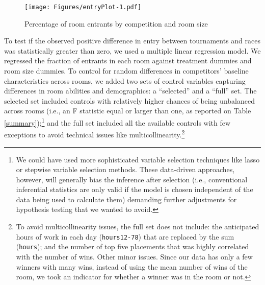 \documentclass[11pt, titlepage]{article}
\begin{document}
\begin{figure}
\caption{Percentage of room entrants by competition and room size}
\label{room entrants}
\texttt{[image: Figures/entryPlot-1.pdf]}
\end{figure}

To test if the observed positive difference in entry between tournaments
and races was statistically greater than zero, we used a multiple linear
regression model. We regressed the fraction of entrants in each room
against treatment dummies and room size dummies. To control for random
differences in competitors' baseline characteristics across rooms, we
added two sets of control variables capturing differences in room
abilities and demographics: a ``selected'' and a ``full'' set. The
selected set included controls with relatively higher chances of being
unbalanced across rooms (i.e., an F statistic equal or larger than one,
as reported on Table \ref{summary});\footnote{We could have used more
  sophisticated variable selection techniques like lasso or stepwise
  variable selection methods. These data-driven approaches, however,
  will generally bias the inference after selection (i.e., conventional
  inferential statistics are only valid if the model is chosen
  independent of the data being used to calculate them) demanding
  further adjustments for hypothesis testing that we wanted to avoid.}
and the full set included all the available controls with few exceptions
to avoid technical issues like multicollinearity.\footnote{To avoid
  multicollinearity issues, the full set does not include: the
  anticipated hours of work in each day (\texttt{hours12-78}) that are
  replaced by the sum (\texttt{hours}); and the number of top five
  placements that was highly correlated with the number of wins. Other
  minor issues. Since our data has only a few winners with many wins,
  instead of using the mean number of wins of the room, we took an
  indicator for whether a winner was in the room or not.}
\end{document}
